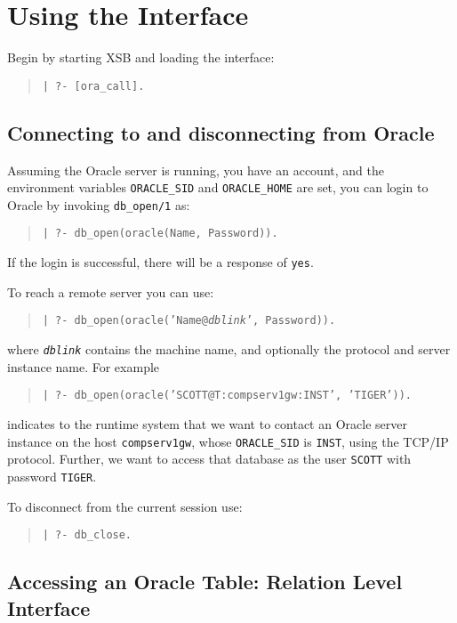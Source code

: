 \section{Using the Interface} \label{oracle:use}

Begin by  starting XSB and loading the interface:
\begin{quote}
	\texttt{| ?- [ora\_call].}
\end{quote}

\subsection{Connecting to and disconnecting from Oracle}

Assuming the Oracle server is running, you have an account, and the
environment variables \texttt{ORACLE\_SID} and \texttt{ORACLE\_HOME}
are set, you can login to Oracle by invoking {\tt db\_open/1} as:
\begin{quote}
{\tt  | ?- db\_open(oracle(Name, Password)).}
\end{quote}
If the login is successful, there will be a response of {\tt yes}.

To reach a remote server you can use:
\begin{quote}
	{\tt  | ?- db\_open(oracle('Name@\emph{dblink}', Password)).}
\end{quote}
where {\tt \emph{dblink}} contains the machine name, and optionally
the protocol and server instance name.  For example
\begin{quote}
 {\tt | ?- db\_open(oracle('SCOTT@T:compserv1gw:INST', 'TIGER')).}
\end{quote}
indicates to the runtime system that we want to contact an Oracle
server instance on the host {\tt compserv1gw}, whose {\tt ORACLE\_SID}
is {\tt INST}, using the TCP/IP protocol.  Further, we want to access
that database as the user \texttt{SCOTT} with password \texttt{TIGER}.

To disconnect from the current session use:
\begin{quote}
{\tt  | ?- db\_close.}
\end{quote}


\subsection{Accessing an Oracle Table: Relation Level Interface}
\label{sec:oracle:rellevel}

